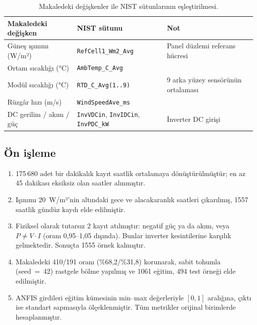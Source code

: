 \documentclass[11pt,a4paper]{article}
\begin{document}
\begin{table}[H]
\centering\small
\caption{Makaledeki değişkenler ile NIST sütunlarının eşleştirilmesi.}
\label{tab:mapping}
\begin{tabular}{@{}lll@{}}
\toprule
Makaledeki değişken & NIST sütunu & Not \\
\midrule
Güneş ışınımı (W/m²) & \texttt{RefCell1\_Wm2\_Avg} & Panel düzlemi referans hücresi \\
Ortam sıcaklığı (°C) & \texttt{AmbTemp\_C\_Avg} & \\
Modül sıcaklığı (°C) & \texttt{RTD\_C\_Avg(1..9)} & 9 arka yüzey sensörünün ortalaması \\
Rüzgâr hızı (m/s) & \texttt{WindSpeedAve\_ms} & \\
DC gerilim / akım / güç & \texttt{InvVDCin}, \texttt{InvIDCin}, \texttt{InvPDC\_kW} & İnverter DC girişi \\
\bottomrule
\end{tabular}
\end{table}

\subsection{Ön işleme}
\begin{enumerate}
\item 175\,680 adet bir dakikalık kayıt saatlik ortalamaya dönüştürülmüştür; en az 45 dakikası eksiksiz olan saatler alınmıştır.
\item Işınımı 20~W/m²'nin altındaki gece ve alacakaranlık saatleri çıkarılmış, 1557 saatlik gündüz kaydı elde edilmiştir.
\item Fiziksel olarak tutarsız 2 kayıt atılmıştır: negatif güç ya da akım, veya $P\neq V\cdot I$ (oranı 0,95–1,05 dışında). Bunlar inverter kesintilerine karşılık gelmektedir. Sonuçta 1555 örnek kalmıştır.
\item Makaledeki 410/191 oranı (\%68,2/\%31,8) korunarak, sabit tohumla (seed~=~42) rastgele bölme yapılmış ve 1061 eğitim, 494 test örneği elde edilmiştir.
\item ANFIS girdileri eğitim kümesinin min–max değerleriyle $[0,1]$ aralığına, çıktı ise standart sapmasıyla ölçeklenmiştir. Tüm metrikler orijinal birimlerde hesaplanmıştır.
\end{enumerate}
\end{document}
